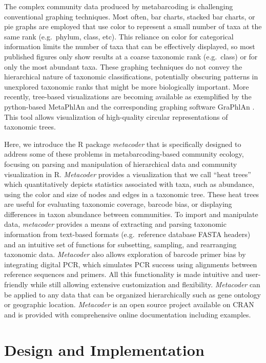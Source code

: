 \documentclass[10pt,letterpaper]{article}
\begin{document}
The complex community data produced by metabarcoding is challenging
conventional graphing techniques. Most often, bar charts, stacked bar
charts, or pie graphs are employed that use color to represent a small
number of taxa at the same rank (e.g.~phylum, class, etc). This reliance
on color for categorical information limits the number of taxa that can
be effectively displayed, so most published figures only show results at
a coarse taxonomic rank (e.g.~class) or for only the most abundant taxa.
These graphing techniques do not convey the hierarchical nature of
taxonomic classifications, potentially obscuring patterns in unexplored
taxonomic ranks that might be more biologically important. More
recently, tree-based visualizations are becoming available as
exemplified by the python-based MetaPhlAn and the corresponding graphing
software GraPhlAn \cite{segata2012metagenomic}. This tool allows
visualization of high-quality circular representations of taxonomic
trees.

Here, we introduce the R package \emph{metacoder} that is specifically
designed to address some of these problems in metabarcoding-based
community ecology, focusing on parsing and manipulation of hierarchical
data and community visualization in R. \emph{Metacoder} provides a
visualization that we call ``heat trees'' which quantitatively depicts
statistics associated with taxa, such as abundance, using the color and
size of nodes and edges in a taxonomic tree. These heat trees are useful
for evaluating taxonomic coverage, barcode bias, or displaying
differences in taxon abundance between communities. To import and
manipulate data, \emph{metacoder} provides a means of extracting and
parsing taxonomic information from text-based formats (e.g.~reference
database FASTA headers) and an intuitive set of functions for
subsetting, sampling, and rearranging taxonomic data. \emph{Metacoder}
also allows exploration of barcode primer bias by integrating digital
PCR, which simulates PCR success using alignments between reference
sequences and primers. All this functionality is made intuitive and
user-friendly while still allowing extensive customization and
flexibility. \emph{Metacoder} can be applied to any data that can be
organized hierarchically such as gene ontology or geographic location.
\emph{Metacoder} is an open source project available on CRAN and is
provided with comprehensive online documentation including examples.


\section*{Design and Implementation}\label{design-and-implementation}
\end{document}
